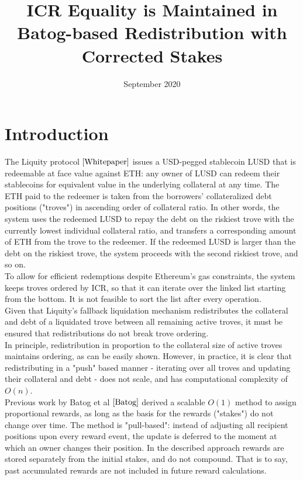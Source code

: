 \documentclass[reqno]{article}
\begin{document}
\title{\textbf{ICR Equality is Maintained in Batog-based Redistribution with Corrected Stakes}}
\date{September 2020}
\maketitle

\tableofcontents

\section{Introduction}


The Liquity protocol $\cite{Whitepaper}$ issues a USD-pegged stablecoin LUSD that is redeemable at face value against ETH: any owner of LUSD can redeem their stablecoins for equivalent value in the underlying collateral at any time. The ETH paid to the redeemer is taken from the borrowers' collateralized debt positions ("troves") in ascending order of collateral ratio. In other words, the system uses the redeemed LUSD to repay the debt on the riskiest trove with the currently lowest individual collateral ratio, and transfers a corresponding amount of ETH from the trove to the redeemer. If the redeemed LUSD is larger than the debt on the riskiest trove, the system proceeds with the second riskiest trove, and so on. \\

To allow for efficient redemptions despite Ethereum's gas constraints, the system keeps troves ordered by ICR, so that it can iterate over the linked list starting from the bottom. It is not feasible to sort the list after every operation. \\

Given that Liquity's fallback liquidation mechanism redistributes the collateral and debt of a liquidated trove between all remaining active troves, it must be  ensured that redistributions do not break trove ordering. \\

In principle, redistribution in proportion to the collateral size of active troves maintains ordering, as can be easily shown. However, in practice, it is clear that redistributing in a "push" based manner - iterating over all troves and updating their collateral and debt - does not scale, and has computational complexity of $O(n)$. \\

Previous work by Batog et al $\cite{Batog}$ derived a scalable $O(1)$ method to assign proportional rewards, as long as the basis for the rewards ("stakes") do not change over time. The method is "pull-based": instead of adjusting all recipient positions upon every reward event, the update is deferred to the moment at which an owner changes their position. In the described approach rewards are stored separately from the initial stakes, and do not compound. That is to say, past accumulated rewards are not included in future reward calculations. \\
\end{document}

